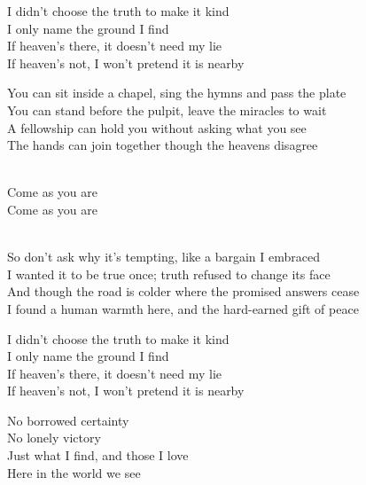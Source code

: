 \begin{lyrics}
I didn't choose the truth to make it kind\\
I only name the ground I find\\
If heaven's there, it doesn't need my lie\\
If heaven's not, I won't pretend it is nearby

You can sit inside a chapel, sing the hymns and pass the plate\\
You can stand before the pulpit, leave the miracles to wait\\
A fellowship can hold you without asking what you see\\
The hands can join together though the heavens disagree

\\
Come as you are\\
Come as you are

\\
So don't ask why it's tempting, like a bargain I embraced\\
I wanted it to be true once; truth refused to change its face\\
And though the road is colder where the promised answers cease\\
I found a human warmth here, and the hard-earned gift of peace

I didn't choose the truth to make it kind\\
I only name the ground I find\\
If heaven's there, it doesn't need my lie\\
If heaven's not, I won't pretend it is nearby

No borrowed certainty\\
No lonely victory\\
Just what I find, and those I love\\
Here in the world we see
\end{lyrics}

